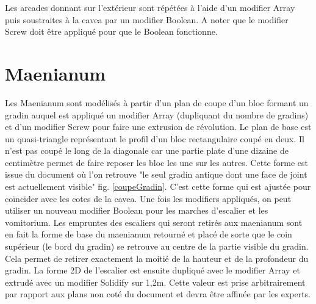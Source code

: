Les arcades donnant sur l'extérieur sont répétées à l'aide d'un modifier Array puis soustraites à la cavea par un modifier Boolean. A noter que le modifier Screw doit être appliqué pour que le Boolean fonctionne.

		\section{Maenianum} 

Les Maenianum sont modélisés à partir d'un plan de coupe d'un bloc formant un gradin auquel est appliqué un modifier Array (dupliquant du nombre de gradins) et d'un modifier Screw pour faire une extrusion de révolution. Le plan de base est un quasi-triangle représentant le profil d'un bloc rectangulaire coupé en deux. Il n'est pas coupé le long de la diagonale car une partie plate d'une dizaine de centimètre permet de faire reposer les bloc les une sur les autres. Cette forme est issue du document \cite{orangeTxt} où l'on retrouve "le seul gradin antique dont une face de joint est actuellement visible" fig. \ref{coupeGradin}. C'est cette forme qui est ajustée pour coïncider avec les cotes de la cavea. Une fois les modifiers appliqués, on peut utiliser un nouveau modifier Boolean pour les marches d'escalier et les vomitorium. Les empruntes des escaliers qui seront retirés aux maenianum sont en fait la forme de base du maenianum retourné et placé de sorte que le coin supérieur (le bord du gradin) se retrouve au centre de la partie visible du gradin. Cela permet de retirer exactement la moitié de la hauteur et de la profondeur du gradin. La forme 2D de l'escalier est ensuite dupliqué avec le modifier Array et extrudé avec un modifier Solidify sur 1,2m. Cette valeur est prise arbitrairement par rapport aux plans non coté du document \cite{orangePl} et devra être affinée par les experts.


